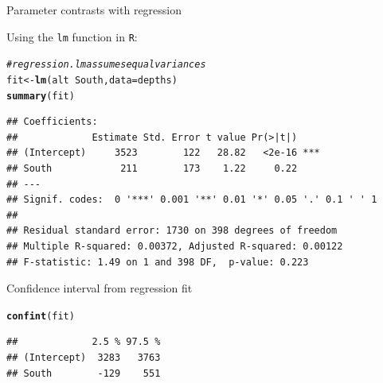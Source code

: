 \documentclass[10pt,handout]{beamer}\usepackage[]{graphicx}\usepackage[]{color}
\makeatletter
\newcommand{\hlcom}[1]{\textcolor[rgb]{0.678,0.584,0.686}{\textit{#1}}}%
\newcommand{\hlopt}[1]{\textcolor[rgb]{0,0,0}{#1}}%
\newcommand{\hlstd}[1]{\textcolor[rgb]{0.345,0.345,0.345}{#1}}%
\newcommand{\hlkwb}[1]{\textcolor[rgb]{0.69,0.353,0.396}{#1}}%
\newcommand{\hlkwc}[1]{\textcolor[rgb]{0.333,0.667,0.333}{#1}}%
\newcommand{\hlkwd}[1]{\textcolor[rgb]{0.737,0.353,0.396}{\textbf{#1}}}%
\newenvironment{kframe}{%
 \def\at@end@of@kframe{}%
 \ifinner\ifhmode%
  \def\at@end@of@kframe{\end{minipage}}%
  \begin{minipage}{\columnwidth}%
 \fi\fi%
 \def\FrameCommand##1{\hskip\@totalleftmargin \hskip-\fboxsep
 \colorbox{shadecolor}{##1}\hskip-\fboxsep
     \hskip-\linewidth \hskip-\@totalleftmargin \hskip\columnwidth}%
 \MakeFramed {\advance\hsize-\width
   \@totalleftmargin\z@ \linewidth\hsize
   \@setminipage}}%
 {\par\unskip\endMakeFramed%
 \at@end@of@kframe}
\newenvironment{knitrout}{}{} %
\makeatother
\begin{document}
\begin{frame}[fragile]{Parameter contrasts with regression}
	
	Using the \texttt{lm} function in \texttt{R}:
	
	
\begin{knitrout}\scriptsize
{}\color{fgcolor}\begin{kframe}
\begin{alltt}
\hlcom{# regression. lm assumes equal variances}
\hlstd{fit} \hlkwb{<-} \hlkwd{lm}\hlstd{(alt} \hlopt{~} \hlstd{South,} \hlkwc{data} \hlstd{= depths)}
\hlkwd{summary}\hlstd{(fit)}
\end{alltt}
\begin{verbatim}
## Coefficients:
##             Estimate Std. Error t value Pr(>|t|)    
## (Intercept)     3523        122   28.82   <2e-16 ***
## South            211        173    1.22     0.22    
## ---
## Signif. codes:  0 '***' 0.001 '**' 0.01 '*' 0.05 '.' 0.1 ' ' 1
## 
## Residual standard error: 1730 on 398 degrees of freedom
## Multiple R-squared: 0.00372,	Adjusted R-squared: 0.00122 
## F-statistic: 1.49 on 1 and 398 DF,  p-value: 0.223
\end{verbatim}
\end{kframe}
\end{knitrout}
	
	
\end{frame}


\begin{frame}[fragile]{Confidence interval from regression fit}
	
\begin{knitrout}\scriptsize
{}\color{fgcolor}\begin{kframe}
\begin{alltt}
\hlkwd{confint}\hlstd{(fit)}
\end{alltt}
\begin{verbatim}
##             2.5 % 97.5 %
## (Intercept)  3283   3763
## South        -129    551
\end{verbatim}
\end{kframe}
\end{knitrout}
	
	
\end{frame}
\end{document}
